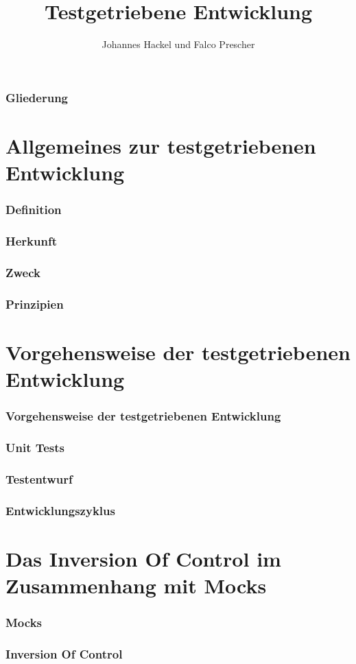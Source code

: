 \documentclass{beamer}
\author{Johannes Hackel und Falco Prescher}
\title{Testgetriebene Entwicklung}
\begin{document}
\begin{frame}
\titlepage
\end{frame}

\begin{frame}
\frametitle{Gliederung}
\tableofcontents
\end{frame}

\section{Allgemeines zur testgetriebenen Entwicklung}
\begin{frame}
\frametitle{Definition}
\end{frame}

\begin{frame}
\frametitle{Herkunft}
\end{frame}

\begin{frame}
\frametitle{Zweck}
\end{frame}

\begin{frame}
\frametitle{Prinzipien}
\end{frame}

\section{Vorgehensweise der testgetriebenen Entwicklung}
\begin{frame}
\frametitle{Vorgehensweise der testgetriebenen Entwicklung}
\end{frame}

\begin{frame}
\frametitle{Unit Tests}
\end{frame}

\begin{frame}
\frametitle{Testentwurf}
\end{frame}

\begin{frame}
\frametitle{Entwicklungszyklus}
\end{frame}

\section{Das Inversion Of Control im Zusammenhang mit Mocks}
\begin{frame}
\frametitle{Mocks}
\end{frame}

\begin{frame}
\frametitle{Inversion Of Control}
\end{frame}
\end{document}

